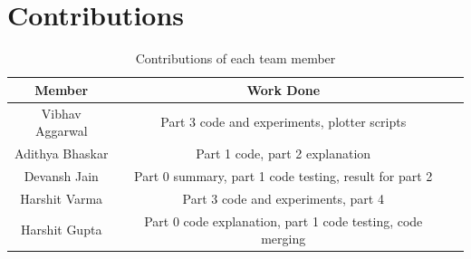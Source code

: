 \documentclass[11pt, swedish, openany]{book}
\begin{document}
\chapter{Contributions}
 {
  \renewcommand{\arraystretch}{1.2}  %
  \begin{table}[h]
      \centering
      \begin{tabular}{|c|c|p{6cm}|}
          \hline
          \textbf{Member} & \textbf{Work Done}                                         \\
          \hline
          \hline
          Vibhav Aggarwal & Part 3 code and experiments, plotter scripts               \\
          Adithya Bhaskar & Part 1 code, part 2 explanation                            \\
          Devansh Jain    & Part 0 summary, part 1 code testing, result for part 2     \\
          Harshit Varma   & Part 3 code and experiments, part 4                        \\
          Harshit Gupta   & Part 0 code explanation, part 1 code testing, code merging \\
          \hline
      \end{tabular}
      \caption{Contributions of each team member}
  \end{table}
 }
\end{document}
